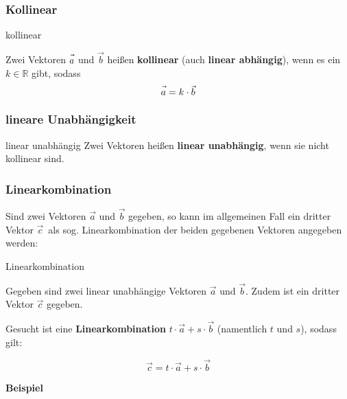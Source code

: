 \subsubsection{Kollinear}

\begin{definition}{kollinear}{}\label{linearkombination}

  Zwei Vektoren $\vec{a\vphantom{b}}$ und $\vec{b}$ heißen
  \textbf{kollinear} (auch \textbf{linear abhängig}), wenn es ein
  $k\in\mathbb{R}$ gibt, sodass
  $$\vec{a\vphantom{b}} = k\cdot{}\vec{b}$$
\end{definition}

\subsubsection{lineare Unabhängigkeit}
\begin{definition}{linear unabhängig}{}
Zwei Vektoren heißen \textbf{linear unabhängig}, wenn sie nicht
kollinear sind.
\end{definition}

\subsubsection{Linearkombination}
Sind zwei Vektoren $\vec{a}$ und $\vec{b}$ gegeben, so kann im
allgemeinen Fall ein
dritter Vektor $\vec{c}$\, als sog. Linearkombination der beiden
gegebenen Vektoren angegeben werden:

\begin{gesetz}{Linearkombination}{}

  Gegeben sind zwei linear unabhängige Vektoren $\vec{a}$ und
  $\vec{b}$. Zudem ist ein dritter Vektor $\vec{c}$ gegeben.

  Gesucht ist eine \textbf{Linearkombination} $t\cdot{}\vec{a} +
  s\cdot{}\vec{b}$ (namentlich $t$ und $s$), sodass gilt:

  $$\vec{c} = t\cdot{}\vec{a} + s\cdot{}\vec{b}$$
\end{gesetz}
\newpage


\textbf{Beispiel}


